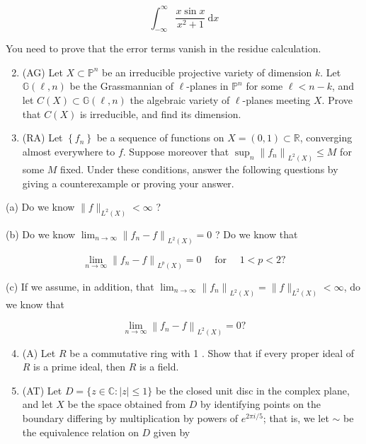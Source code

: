 \documentclass[10pt]{article}
\begin{document}
$$
\int_{-\infty}^{\infty} \frac{x \sin x}{x^{2}+1} \mathrm{~d} x
$$

You need to prove that the error terms vanish in the residue calculation.

\begin{enumerate}
  \setcounter{enumi}{1}
  \item (AG) Let $X \subset \mathbb{P}^{n}$ be an irreducible projective variety of dimension $k$. Let $\mathbb{G}(\ell, n)$ be the Grassmannian of $\ell$-planes in $\mathbb{P}^{n}$ for some $\ell<n-k$, and let $C(X) \subset \mathbb{G}(\ell, n)$ the algebraic variety of $\ell$-planes meeting $X$. Prove that $C(X)$ is irreducible, and find its dimension.

  \item (RA) Let $\left\{f_{n}\right\}$ be a sequence of functions on $X=(0,1) \subset \mathbb{R}$, converging almost everywhere to $f$. Suppose moreover that $\sup _{n}\left\|f_{n}\right\|_{L^{2}(X)} \leq M$ for some $M$ fixed. Under these conditions, answer the following questions by giving a counterexample or proving your answer.

\end{enumerate}

(a) Do we know $\|f\|_{L^{2}(X)}<\infty$ ?

(b) Do we know $\lim _{n \rightarrow \infty}\left\|f_{n}-f\right\|_{L^{2}(X)}=0$ ? Do we know that

$$
\lim _{n \rightarrow \infty}\left\|f_{n}-f\right\|_{L^{p}(X)}=0 \quad \text { for } \quad 1<p<2 ?
$$

(c) If we assume, in addition, that $\lim _{n \rightarrow \infty}\left\|f_{n}\right\|_{L^{2}(X)}=\|f\|_{L^{2}(X)}<\infty$, do we know that

$$
\lim _{n \rightarrow \infty}\left\|f_{n}-f\right\|_{L^{2}(X)}=0 ?
$$

\begin{enumerate}
  \setcounter{enumi}{3}
  \item (A) Let $R$ be a commutative ring with 1 . Show that if every proper ideal of $R$ is a prime ideal, then $R$ is a field.

  \item (AT) Let $D=\{z \in \mathbb{C}:|z| \leq 1\}$ be the closed unit disc in the complex plane, and let $X$ be the space obtained from $D$ by identifying points on the boundary differing by multiplication by powers of $e^{2 \pi i / 5}$; that is, we let $\sim$ be the equivalence relation on $D$ given by

\end{enumerate}
\end{document}
